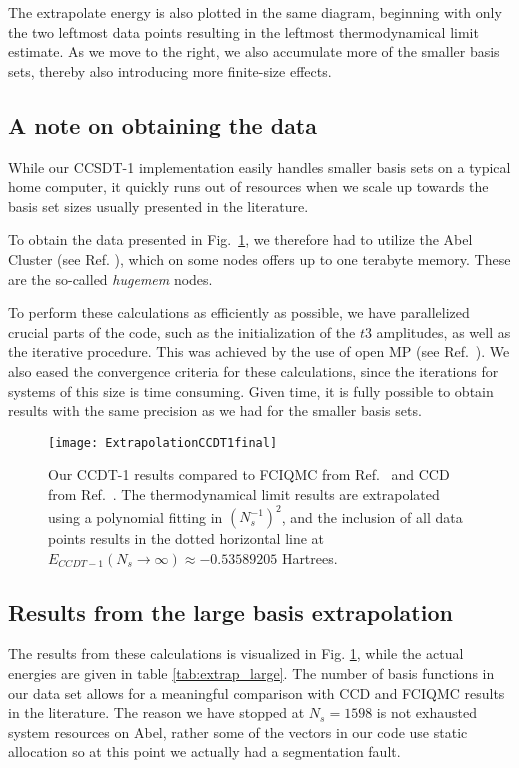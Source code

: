 The extrapolate energy is also plotted in the same diagram, beginning with only the two leftmost data points resulting in the leftmost thermodynamical limit estimate. As we move to the right, we also accumulate more of the smaller basis sets, thereby also introducing more finite-size effects. 

\subsection{A note on obtaining the data}

While our CCSDT-1 implementation easily handles smaller basis sets on a typical home computer, it quickly runs out of resources when we scale up towards the basis set sizes usually presented in the literature. 

To obtain the data presented in Fig.~\ref{fig:extrapol}, we therefore had to utilize the Abel Cluster (see Ref. \cite{abel}), which on some nodes offers up to one terabyte memory. These are the so-called \emph{hugemem} nodes.

To perform these calculations as efficiently as possible, we have parallelized crucial parts of the code, such as the initialization of the $t3$ amplitudes, as well as the iterative procedure. This was achieved by the use of open MP (see Ref.~\cite{openmp}). We also eased the convergence criteria for these calculations, since the iterations for systems of this size is time consuming. Given time, it is fully possible to obtain results with the same precision as we had for the smaller basis sets.

\begin{figure}[p]
    \centering
    \texttt{[image: ExtrapolationCCDT1final]}
    \caption{Our CCDT-1 results compared to FCIQMC from Ref.~\cite{Shepherd2012} and CCD from Ref.~\cite{Baardsen2015}. The thermodynamical limit results are extrapolated using a polynomial fitting in $(N_s^{-1})^2$, and the inclusion of all data points results in the dotted horizontal line at $E_{CCDT-1}(N_s \rightarrow \infty) \approx -0.53589205$ Hartrees.}
    \label{fig:extrapol}
\end{figure}

\subsection{Results from the large basis extrapolation}

The results from these calculations is visualized in Fig. \ref{fig:extrapol}, while the actual energies are given in table \ref{tab:extrap_large}. The number of basis functions in our data set allows for a meaningful comparison with CCD and FCIQMC results in the literature. The reason we have stopped at $N_s = 1598$ is not exhausted system resources on Abel, rather some of the vectors in our code use static allocation so at this point we actually had a segmentation fault.

